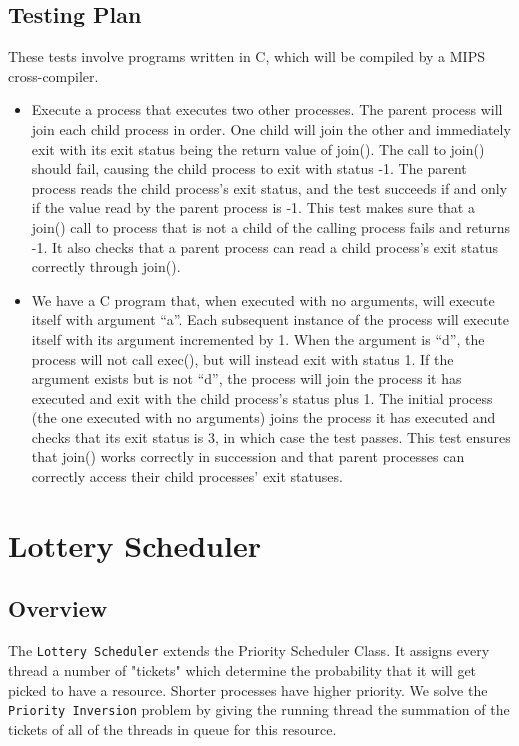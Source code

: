 \documentclass{article}
\begin{document}
\subsection{Testing Plan}
These tests involve programs written in C, which will be compiled by a MIPS cross-compiler.
\begin{itemize}
    \item Execute a process that executes two other processes. The parent process will join each child process in order. One child will join the other and immediately exit with its exit status being the return value of {\ttfamily join()}. The call to {\ttfamily join()} should fail, causing the child process to exit with status -1. The parent process reads the child process's exit status, and the test succeeds if and only if the value read by the parent process is -1. This test makes sure that a {\ttfamily join()} call to process that is not a child of the calling process fails and returns -1. It also checks that a parent process can read a child process's exit status correctly through {\ttfamily join()}.
    \item We have a C program that, when executed with no arguments, will execute itself with argument ``a''. Each subsequent instance of the process will execute itself with its argument incremented by 1. When the argument is ``d'', the process will not call {\ttfamily exec()}, but will instead exit with status 1. If the argument exists but is not ``d'', the process will join the process it has executed and exit with the child process's status plus 1. The initial process (the one executed with no arguments) joins the process it has executed and checks that its exit status is 3, in which case the test passes. This test ensures that {\ttfamily join()} works correctly in succession and that parent processes can correctly access their child processes' exit statuses.
\end{itemize}

\section{Lottery Scheduler}

\subsection{Overview}
The \texttt{Lottery Scheduler} extends the Priority Scheduler Class. It assigns every thread a number of "tickets" which determine the probability that it will get picked to have a resource. Shorter processes have higher priority. We solve the \texttt{Priority Inversion} problem by giving the running thread the summation of the tickets of all of the threads in queue for this resource.
\end{document}
